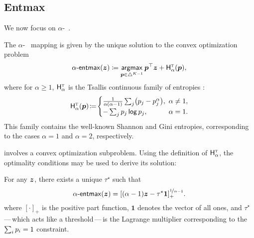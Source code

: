 \subsection{Entmax}\label{sec:entmax_bg}

\noindent We now focus on $\alpha$-\entmaxtext~\citep{blondel2019learning,entmax}.

\newpage

\begin{definition}[$\alpha$-\entmaxtext]
    The $\alpha$-\entmaxtext~\citep{blondel2019learning,entmax} mapping
    is given by the unique solution to the convex optimization problem
    \begin{equation}\label{eq:define_entmax}
        \mathop{\mathsf{\alpha}\textnormal{-}\mathsf{entmax}}(\bm{z}) \coloneqq
        \operatorname*{\mathsf{argmax}}_{\bm{p} \in \triangle^{K-1}} \bm{p}^\top\bm{z} + \mathsf{H}^{{\textsc{t}}}_{\alpha}(\bm{p}),
    \end{equation}
    where for $\alpha\geq1$,
    $\mathsf{H}^{{\textsc{t}}}_\alpha$ is the Tsallis continuous family of entropies
    \citep{Tsallis1988}:
    \begin{equation}\label{eq:tsallisdef}
        \HHt_{\alpha}(\bm{p})\!\coloneqq\!
        \begin{cases}
            \frac{1}{\alpha(\alpha-1)}\sum_j\!\left(p_j - p_j^\alpha\right)\!, &
            \!\!\!\alpha \ne 1,                                                  \\
            -\sum_j \pp_j \log \pp_j,                                          &
            \!\!\!\alpha = 1.
        \end{cases}
    \end{equation}
    This family contains the well-known Shannon and Gini entropies,
    corresponding to the cases $\alpha=1$ and $\alpha=2$, respectively.
\end{definition}

 involves a convex optimization subproblem. Using the
definition of $\mathsf{H}^{{\textsc{t}}}_\alpha$, the optimality conditions may be used to derive its solution:

\begin{lemma}
    \label{lemma:tsallis_reduction}%
    For any $\bm{z}$, there exists a unique $\tau^\star$ such that
    \begin{equation}\label{eq:entmax_form}
        \mathop{\mathsf{\alpha}\textnormal{-}\mathsf{entmax}}(\bm{z})
        = [(\alpha - 1){\bm{z}} - \tau^\star \bm{1}]_+^{\nicefrac{1}{\alpha-1}}.
    \end{equation}
    where $[\cdot]_+$ is the positive part function, $\bm{1}$
    denotes the vector of all ones, and $\tau^\star$\,---\,which acts like a
    threshold\,---\,is the Lagrange multiplier corresponding to the $\sum_i
        p_i=1$ constraint.
\end{lemma}

